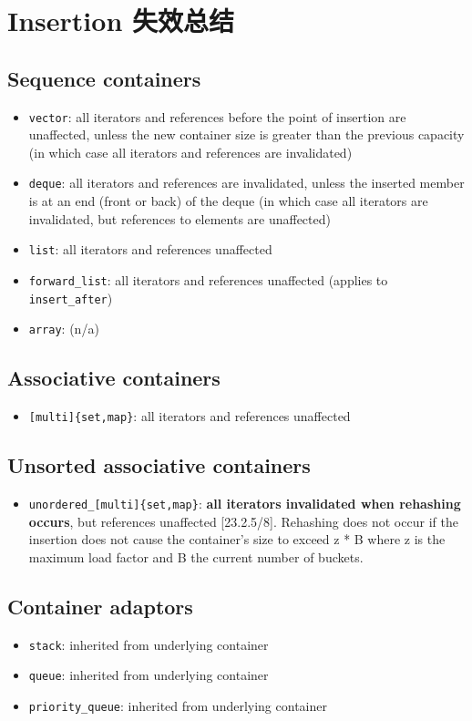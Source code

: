 \documentclass[UTF8,a4paper,12pt]{ctexbook}
\begin{document}
	\section{Insertion 失效总结}
		\subsection{Sequence containers}
			\begin{itemize}
				\item \verb|vector|: all iterators and references before the point of insertion are unaffected, unless the new container size is greater than the previous capacity (in which case all iterators and references are invalidated)
				\item \verb|deque|: all iterators and references are invalidated, unless the inserted member is at an end (front or back) of the deque (in which case all iterators are invalidated, but references to elements are unaffected)
				\item \verb|list|: all iterators and references unaffected 
				\item \verb|forward_list|: all iterators and references unaffected (applies to \verb|insert_after|) 
				\item \verb|array|: (n/a)
			\end{itemize}
		\subsection{Associative containers}
			\begin{itemize}
				\item \verb|[multi]{set,map}|: all iterators and references unaffected
			\end{itemize}
		\subsection{Unsorted associative containers}
			\begin{itemize}
				\item \verb|unordered_[multi]{set,map}|: \textbf{all iterators invalidated when rehashing occurs}, but references unaffected [23.2.5/8]. Rehashing does not occur if the insertion does not cause the container's size to exceed z * B where z is the maximum load factor and B the current number of buckets.
			\end{itemize}
		
		\subsection{Container adaptors}
			\begin{itemize}
				\item \verb|stack|: inherited from underlying container
				\item \verb|queue|: inherited from underlying container
				\item \verb|priority_queue|: inherited from underlying container
			\end{itemize}
\end{document}
